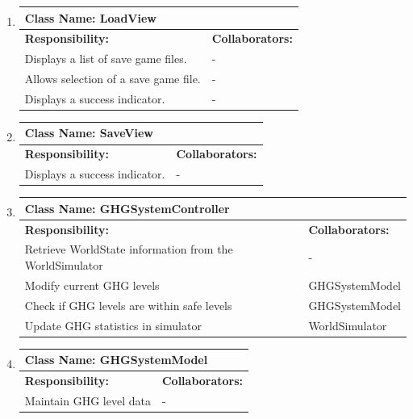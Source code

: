 \documentclass[]{article}
\begin{document}
\begin{enumerate}[1.]
\begin{tabular}{|p{10cm}|p{4cm}|}
	    \hline
	  \end{tabular}

	\item
	\begin{tabular}{|p{10cm}|p{4cm}|}
	    \hline
	     \multicolumn{2}{|l|}{\textbf{Class Name:  LoadView}} \\
	    \hline
	    \textbf{Responsibility:} & \textbf{Collaborators:} \\
	    \hline
	    Displays a list of save game files. & - \\
	Allows selection of a save game file. & - \\
	Displays a success indicator. & - \\

	    \hline
	  \end{tabular}

	\item
	\begin{tabular}{|p{10cm}|p{4cm}|}
	    \hline
	     \multicolumn{2}{|l|}{\textbf{Class Name:  SaveView}} \\
	    \hline
	    \textbf{Responsibility:} & \textbf{Collaborators:} \\
	    \hline
	    Displays a success indicator. & - \\

	    \hline
	  \end{tabular}

	\item
	\begin{tabular}{|p{10cm}|p{4cm}|}
	    \hline
	     \multicolumn{2}{|l|}{\textbf{Class Name:  GHGSystemController}} \\
	    \hline
	    \textbf{Responsibility:} & \textbf{Collaborators:} \\
	    \hline
			Retrieve WorldState information from the WorldSimulator & - \\
	    Modify current GHG levels & GHGSystemModel \\
	Check if GHG levels are within safe levels & GHGSystemModel \\
	Update GHG statistics in simulator & WorldSimulator \\

	    \hline
	  \end{tabular}

	\item
	\begin{tabular}{|p{10cm}|p{4cm}|}
	    \hline
	     \multicolumn{2}{|l|}{\textbf{Class Name:  GHGSystemModel}} \\
	    \hline
	    \textbf{Responsibility:} & \textbf{Collaborators:} \\
	    \hline
	    Maintain GHG level data & - \\


\end{tabular}
\end{enumerate}
\end{document}
